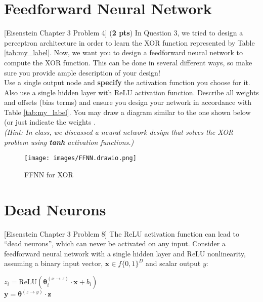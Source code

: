 \documentclass[11pt, letterpaper]{article}
\begin{document}
\bigskip

\newpage
\section{Feedforward Neural Network}
    
    [Eisenstein Chapter 3 Problem 4] (\textbf{2 pts}) In Question 3, we tried to design a perceptron architecture in order to learn the XOR function represented by Table \ref{tab:my_label}. Now, we want you to design a feedforward neural network to compute the XOR function. This can be done in several different ways, so make sure you provide ample description of your design!\\
    
    \noindent Use a single output node and \textbf{specify} the activation function you choose for it. Also use a single hidden layer with ReLU activation function.  Describe all weights and offsets (bias terms) and ensure you design your network in accordance with Table \ref{tab:my_label}. You may draw a diagram similar to the one shown below (or just indicate the weights .\\
    
    \noindent \textit{(Hint: In class, we discussed a neural network design that solves the XOR problem using \textbf{tanh} activation functions.)}

    \begin{figure}[h]
    \centering
    \texttt{[image: images/FFNN.drawio.png]}
    \caption{FFNN for XOR}
    \label{fig:my_label}
    \end{figure}
    
    \newpage
    \section{Dead Neurons}
        
    [Eisenstein Chapter 3 Problem 8] The ReLU activation function can lead to ``dead neurons'', which can never be activated on any input. Consider a feedforward neural network with a single hidden layer and ReLU nonlinearity, assuming a binary input vector, $\mathbf{x} \in f\{0,1\}^D$  and scalar output $y$:
    \begin{center}
    $z_i = \text{ReLU}(\mathbf{\theta}_i^{(x \rightarrow z)} \cdot \mathbf{x} + b_i)$ \\
    $\mathbf{y} = \mathbf{\theta}^{(z \rightarrow y)} \cdot \mathbf{z}$
    \end{center}
    
\end{document}
